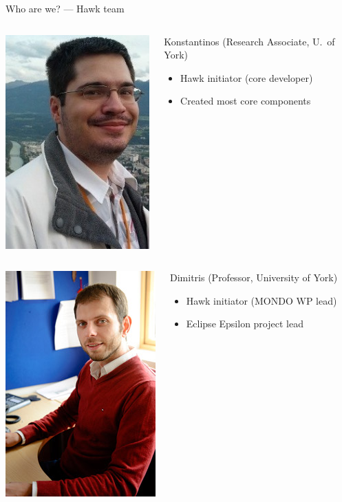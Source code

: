 \documentclass[10pt]{beamer}
\begin{document}
\begin{frame}{Who are we? --- Hawk team}
\begin{columns}
\centering
\includegraphics[height=.25\textheight,clip,trim={0 3cm 0 0}]{biopic-02-konstantinos}
\begin{block}{Konstantinos (Research Associate, U.\ of York)}
\begin{itemize}
\item Hawk initiator (core developer)
\item Created most core components
\end{itemize}
\end{block}
\end{columns}

\begin{columns}
\centering
\includegraphics[height=.25\textheight,clip,trim={0 4cm 0 0}]{biopic-03-dimitris}
\centering
\begin{block}{Dimitris (Professor, University of York)}
\begin{itemize}
\item Hawk initiator (MONDO WP lead)
\item Eclipse Epsilon project lead
\end{itemize}
\end{block}
\end{columns}

\end{frame}
\end{document}
